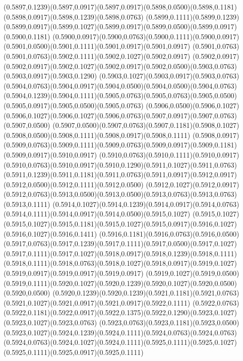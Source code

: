 (0.5897,0.1239)(0.5897,0.0917)(0.5897,0.0917)(0.5898,0.0500)(0.5898,0.1181)(0.5898,0.0917)(0.5898,0.1239)(0.5898,0.0763)
(0.5899,0.1111)(0.5899,0.1239)(0.5899,0.0917)(0.5899,0.1027)(0.5899,0.0917)(0.5899,0.0500)(0.5899,0.0917)(0.5900,0.1181)
(0.5900,0.0917)(0.5900,0.0763)(0.5900,0.1111)(0.5900,0.0917)(0.5901,0.0500)(0.5901,0.1111)(0.5901,0.0917)(0.5901,0.0917)
(0.5901,0.0763)(0.5901,0.0763)(0.5902,0.1111)(0.5902,0.1027)(0.5902,0.0917)
\PST@Solid(0.5902,0.0917)(0.5902,0.0917)(0.5902,0.1027)(0.5902,0.0917)(0.5902,0.0500)(0.5903,0.0763)(0.5903,0.0917)(0.5903,0.1290)
(0.5903,0.1027)(0.5903,0.0917)(0.5903,0.0763)(0.5904,0.0763)(0.5904,0.0917)(0.5904,0.0500)(0.5904,0.0500)(0.5904,0.0763)
(0.5904,0.1239)(0.5904,0.1111)(0.5905,0.0763)(0.5905,0.0763)(0.5905,0.0500)(0.5905,0.0917)(0.5905,0.0500)(0.5905,0.0763)
(0.5906,0.0500)(0.5906,0.1027)(0.5906,0.1027)(0.5906,0.1027)(0.5906,0.0763)(0.5907,0.0917)(0.5907,0.0763)(0.5907,0.0500)
(0.5907,0.0500)(0.5907,0.0763)(0.5907,0.1181)(0.5908,0.1027)(0.5908,0.0500)(0.5908,0.1111)(0.5908,0.0917)(0.5908,0.1111)
(0.5908,0.0917)(0.5909,0.0763)(0.5909,0.1111)(0.5909,0.0763)(0.5909,0.0917)(0.5909,0.1181)(0.5909,0.0917)(0.5910,0.0917)
(0.5910,0.0763)(0.5910,0.1111)(0.5910,0.0917)(0.5910,0.0763)(0.5910,0.0917)(0.5910,0.1290)(0.5911,0.1027)(0.5911,0.0763)
(0.5911,0.1239)(0.5911,0.1181)(0.5911,0.0763)(0.5911,0.0917)(0.5912,0.0917)(0.5912,0.0500)(0.5912,0.1111)(0.5912,0.0500)
(0.5912,0.1027)(0.5912,0.0917)(0.5912,0.0763)(0.5913,0.0500)(0.5913,0.0500)(0.5913,0.0763)(0.5913,0.0763)(0.5913,0.1111)
(0.5914,0.1027)(0.5914,0.1239)(0.5914,0.0917)(0.5914,0.0763)(0.5914,0.1111)(0.5914,0.0917)(0.5914,0.0500)(0.5915,0.1027)
(0.5915,0.1027)(0.5915,0.1027)(0.5915,0.1181)(0.5915,0.1027)(0.5915,0.0917)(0.5916,0.1027)(0.5916,0.1027)(0.5916,0.1411)
(0.5916,0.1181)(0.5916,0.0763)(0.5916,0.0500)(0.5917,0.0763)(0.5917,0.1239)(0.5917,0.1111)(0.5917,0.0500)(0.5917,0.1027)
(0.5917,0.1111)(0.5917,0.1027)(0.5918,0.0917)(0.5918,0.1239)(0.5918,0.1111)
\PST@Solid(0.5918,0.1111)(0.5918,0.0763)(0.5918,0.1027)(0.5918,0.0917)(0.5919,0.1027)(0.5919,0.0917)(0.5919,0.0917)(0.5919,0.0917)
(0.5919,0.1027)(0.5919,0.0500)(0.5919,0.1111)(0.5920,0.1027)(0.5920,0.1239)(0.5920,0.1027)(0.5920,0.0500)(0.5920,0.0500)
(0.5920,0.1239)(0.5920,0.1239)(0.5921,0.1181)(0.5921,0.0763)(0.5921,0.1027)(0.5921,0.0917)(0.5921,0.0917)(0.5922,0.1111)
(0.5922,0.0763)(0.5922,0.1181)(0.5922,0.0917)(0.5922,0.1375)(0.5922,0.1290)(0.5923,0.1027)(0.5923,0.1027)(0.5923,0.0763)
(0.5923,0.0763)(0.5923,0.1181)(0.5923,0.0500)(0.5923,0.1027)(0.5924,0.1239)(0.5924,0.1111)(0.5924,0.0763)(0.5924,0.0763)
(0.5924,0.0763)(0.5924,0.1027)(0.5924,0.1111)(0.5925,0.1111)(0.5925,0.1027)(0.5925,0.1111)(0.5925,0.0917)(0.5925,0.1111)
